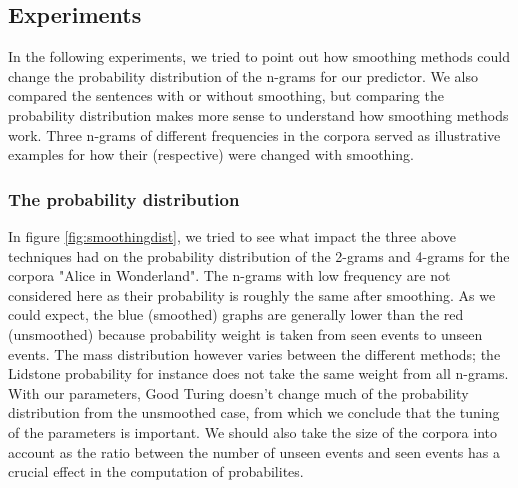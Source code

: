 \documentclass[a4paper,12pt]{article}
\begin{document}
	\subsection{Experiments}
	
	In the following experiments, we tried to point out how smoothing methods could change the probability distribution of the n-grams for our predictor. We also compared the sentences with or without smoothing, but comparing the probability distribution makes more sense to understand how smoothing methods work. Three n-grams of different frequencies in the corpora served as illustrative examples for how their (respective) were changed with smoothing.
	
\subsubsection{The probability distribution}
	In figure \ref{fig:smoothingdist}, we tried to see what impact the three above techniques had on the probability distribution of the 2-grams and 4-grams for the corpora "Alice in Wonderland". The n-grams with low frequency are not considered here as their probability is roughly the same after smoothing. As we could expect, the blue (smoothed) graphs are generally lower than the red (unsmoothed) because probability weight is taken from seen events to unseen events. The mass distribution however varies between the different methods; the Lidstone probability for instance does not take the same weight from all n-grams. With our parameters, Good Turing doesn't change much of the probability distribution from the unsmoothed case, from which we conclude that the tuning of the parameters is important. We should also take the size of the corpora into account as the ratio between the number of unseen events and seen events has a crucial effect in the computation of probabilites.
\end{document}

